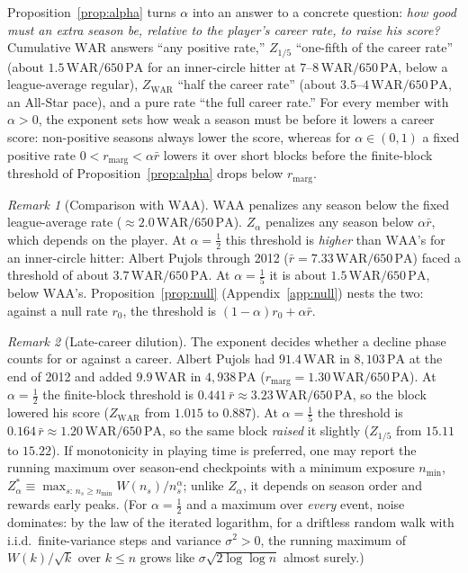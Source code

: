 \documentclass[11pt,letterpaper]{article}
\theoremstyle{plain}
\theoremstyle{definition}
\theoremstyle{remark}
\newtheorem{remark}{Remark}
\newcommand{\WAR}{\mathrm{WAR}}
\newcommand{\WAA}{\mathrm{WAA}}
\newcommand{\PA}{\mathrm{PA}}
\newcommand{\ZWAR}{Z_{\WAR}}
\begin{document}
Proposition~\ref{prop:alpha} turns $\alpha$ into an answer to a concrete question: \emph{how good must an extra season be, relative to the player's career rate, to raise his score?} Cumulative $\WAR$ answers ``any positive rate,'' $Z_{1/5}$ ``one-fifth of the career rate'' (about $1.5\,\WAR/650\,\PA$ for an inner-circle hitter at $7$--$8\,\WAR/650\,\PA$, below a league-average regular), $\ZWAR$ ``half the career rate'' (about $3.5$--$4\,\WAR/650\,\PA$, an All-Star pace), and a pure rate ``the full career rate.'' For every member with $\alpha > 0$, the exponent sets how weak a season must be before it lowers a career score: non-positive seasons always lower the score, whereas for $\alpha \in (0, 1)$ a fixed positive rate $0 < r_{\mathrm{marg}} < \alpha\bar r$ lowers it over short blocks before the finite-block threshold of Proposition~\ref{prop:alpha} drops below $r_{\mathrm{marg}}$.

\begin{remark}[Comparison with $\WAA$]
\label{rem:waa}
$\WAA$ penalizes any season below the fixed league-average rate ($\approx 2.0\,\WAR/650\,\PA$). $Z_\alpha$ penalizes any season below $\alpha\bar r$, which depends on the player. At $\alpha = \tfrac12$ this threshold is \emph{higher} than $\WAA$'s for an inner-circle hitter: Albert Pujols through 2012 ($\bar r = 7.33\,\WAR/650\,\PA$) faced a threshold of about $3.7\,\WAR/650\,\PA$. At $\alpha = \tfrac15$ it is about $1.5\,\WAR/650\,\PA$, below $\WAA$'s. Proposition~\ref{prop:null} (Appendix~\ref{app:null}) nests the two: against a null rate $r_0$, the threshold is $(1-\alpha)r_0 + \alpha\bar r$.
\end{remark}

\begin{remark}[Late-career dilution]
\label{rem:envelope}
The exponent decides whether a decline phase counts for or against a career. Albert Pujols had $91.4\,\WAR$ in $8{,}103\,\PA$ at the end of 2012 and added $9.9\,\WAR$ in $4{,}938\,\PA$ ($r_{\mathrm{marg}} = 1.30\,\WAR/650\,\PA$). At $\alpha = \tfrac12$ the finite-block threshold is $0.441\,\bar r \approx 3.23\,\WAR/650\,\PA$, so the block lowered his score ($\ZWAR$ from $1.015$ to $0.887$). At $\alpha = \tfrac15$ the threshold is $0.164\,\bar r \approx 1.20\,\WAR/650\,\PA$, so the same block \emph{raised} it slightly ($Z_{1/5}$ from $15.11$ to $15.22$). If monotonicity in playing time is preferred, one may report the running maximum over season-end checkpoints with a minimum exposure $n_{\min}$, $Z_\alpha^* \equiv \max_{s:\,n_s \ge n_{\min}} W(n_s)/n_s^{\alpha}$; unlike $Z_\alpha$, it depends on season order and rewards early peaks. (For $\alpha = \tfrac12$ and a maximum over \emph{every} event, noise dominates: by the law of the iterated logarithm, for a driftless random walk with i.i.d.\ finite-variance steps and variance $\sigma^2 > 0$, the running maximum of $W(k)/\sqrt{k}$ over $k \le n$ grows like $\sigma\sqrt{2\log\log n}$ almost surely.)
\end{remark}
\end{document}
